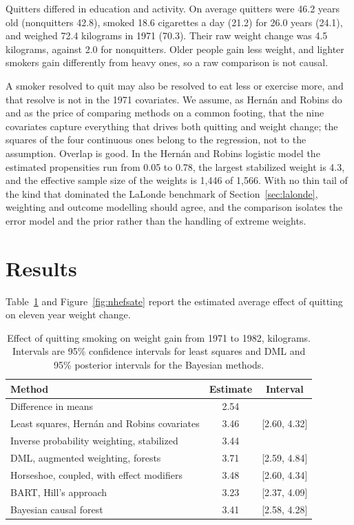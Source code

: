 Quitters differed in education and activity. On average quitters were 46.2 years old (nonquitters 42.8), smoked 18.6 cigarettes a day (21.2) for 26.0 years (24.1), and weighed 72.4 kilograms in 1971 (70.3). Their raw weight change was 4.5 kilograms, against 2.0 for nonquitters. Older people gain less weight, and lighter smokers gain differently from heavy ones, so a raw comparison is not causal.

A smoker resolved to quit may also be resolved to eat less or exercise more, and that resolve is not in the 1971 covariates. We assume, as Hern\'an and Robins do and as the price of comparing methods on a common footing, that the nine covariates capture everything that drives both quitting and weight change; the squares of the four continuous ones belong to the regression, not to the assumption. Overlap is good. In the Hern\'an and Robins logistic model the estimated propensities run from 0.05 to 0.78, the largest stabilized weight is 4.3, and the effective sample size of the weights is 1,446 of 1,566. With no thin tail of the kind that dominated the LaLonde benchmark of Section~\ref{sec:lalonde}, weighting and outcome modelling should agree, and the comparison isolates the error model and the prior rather than the handling of extreme weights.

\section{Results}

Table~\ref{tab:nhefs} and Figure~\ref{fig:nhefsate} report the estimated average effect of quitting on eleven year weight change.

\begin{table}[ht]
\centering
\caption{Effect of quitting smoking on weight gain from 1971 to 1982, kilograms. Intervals are 95\% confidence intervals for least squares and DML and 95\% posterior intervals for the Bayesian methods.}
\label{tab:nhefs}
\small
\begin{tabular}{p{2.5in}cc}
\toprule
Method & Estimate & Interval \\
\midrule
Difference in means & 2.54 & \\
Least squares, Hern\'an and Robins covariates & 3.46 & [2.60, 4.32] \\
Inverse probability weighting, stabilized & 3.44 & \\
DML, augmented weighting, forests & 3.71 & [2.59, 4.84] \\
Horseshoe, coupled, with effect modifiers & 3.48 & [2.60, 4.34] \\
BART, Hill's approach & 3.23 & [2.37, 4.09] \\
Bayesian causal forest & 3.41 & [2.58, 4.28] \\
\bottomrule
\end{tabular}
\end{table}

